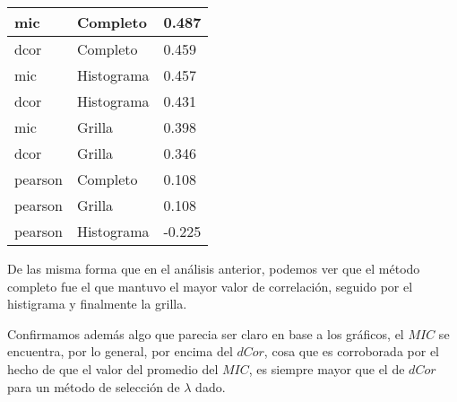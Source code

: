     \begin{table}[H]
        \centering
        \begin{tabular}{|l|l|l|}\hline
        mic     & Completo    & 0.487  \\\hline
        dcor    & Completo    & 0.459  \\
        mic     & Histograma  & 0.457  \\
        dcor    & Histograma  & 0.431  \\
        mic     & Grilla      & 0.398  \\
        dcor    & Grilla      & 0.346 \\
        pearson & Completo    & 0.108  \\
        pearson & Grilla      & 0.108  \\
        pearson & Histograma  & -0.225 \\\hline
        \end{tabular}
    \end{table}
    
    De las misma forma que en el an\'alisis anterior, podemos ver que el m\'etodo completo fue el que mantuvo el mayor valor de correlaci\'on, seguido por el histigrama y finalmente la grilla. 
    
    Confirmamos adem\'as algo que parecia ser claro en base a los gr\'aficos, el $MIC$ se encuentra, por lo general, por encima del $dCor$, cosa que es corroborada por el hecho de que el valor del promedio del $MIC$, es siempre mayor que el de $dCor$ para un m\'etodo de selecci\'on de $\lambda$ dado.